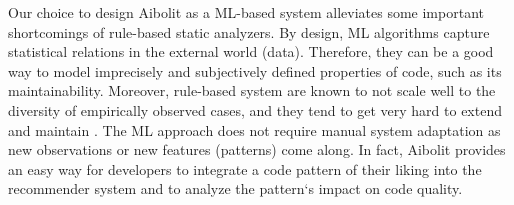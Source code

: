 Our choice to design Aibolit as a ML-based system alleviates some important
shortcomings of rule-based static analyzers. By design, ML algorithms capture
statistical relations in the external world (data). Therefore, they can be a
good way to model imprecisely and subjectively defined properties of code, such
as its maintainability. Moreover, rule-based system are known to not scale well
to the diversity of empirically observed cases, and they tend to get very hard
to extend and maintain \citep{LenatFeigenbaum1987}. The ML
approach does not require
manual system adaptation as new observations or new features (patterns) come
along. In fact, Aibolit provides an easy way for developers to integrate a code
pattern of their liking into the recommender system and to analyze the pattern`s
impact on code quality.